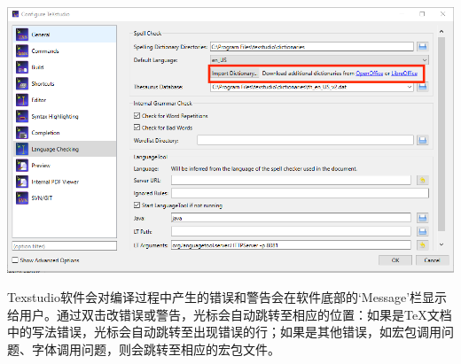 \documentclass[12pt]{book}
\begin{document}
\begin{center}
     \includegraphics[width=0.8\linewidth]{./lang-check.png}
\end{center}

Texstudio软件会对编译过程中产生的错误和警告会在软件底部的`Message’栏显示给用户。通过双击改错误或警告，光标会自动跳转至相应的位置：如果是\TeX{}文档中的写法错误，光标会自动跳转至出现错误的行；如果是其他错误，如宏包调用问题、字体调用问题，则会跳转至相应的宏包文件。
\end{document}

